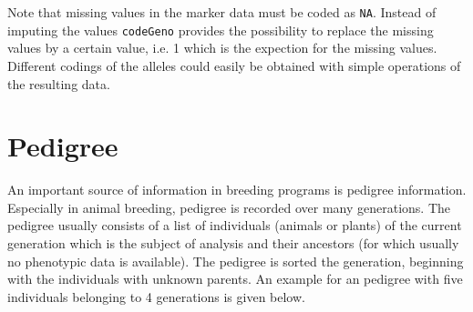 \documentclass[a4paper,11pt]{article}
\begin{document}

Note that missing values in the marker data must be coded as \texttt{NA}. Instead of imputing the values \texttt{codeGeno} provides the possibility to replace the missing values by a certain value, i.e. 1 which is the expection for the missing values. Different codings of the alleles could easily be obtained with simple operations of the resulting data.


\section{Pedigree}\label{sec:Pedigree}     
                               
An important source of information in breeding programs is pedigree information. Especially in animal breeding, pedigree is recorded over many generations. The pedigree usually consists 
of a list of individuals (animals or plants) of the current generation which is the subject of analysis and their ancestors (for which usually no phenotypic data is available). The pedigree is sorted the generation, beginning with the individuals with unknown parents. An example for an pedigree with five individuals belonging to 4 generations is given below.
\end{document}
